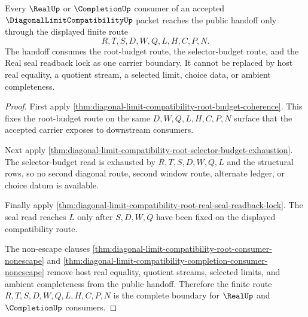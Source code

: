 \begin{theorem}
\label{thm:diagonal-limit-compatibility-finite-window-handoff-boundary}
Every $\RealUp$ or $\CompletionUp$ consumer of an accepted
$\DiagonalLimitCompatibilityUp$ packet reaches the public handoff only through
the displayed finite route
$$
R,T,S,D,W,Q,L,H,C,P,N.
$$
The handoff consumes the root-budget route, the selector-budget route, and the
Real seal readback lock as one carrier boundary. It cannot be replaced by host
real equality, a quotient stream, a selected limit, choice data, or ambient
completeness.
\end{theorem}
\begin{proof}
First apply
\autoref{thm:diagonal-limit-compatibility-root-budget-coherence}. This fixes
the root-budget route on the same $D,W,Q,L,H,C,P,N$ surface that the accepted
carrier exposes to downstream consumers.

Next apply
\autoref{thm:diagonal-limit-compatibility-root-selector-budget-exhaustion}.
The selector-budget read is exhausted by $R,T,S,D,W,Q,L$ and the structural
rows, so no second diagonal route, second window route, alternate ledger, or
choice datum is available.

Finally apply
\autoref{thm:diagonal-limit-compatibility-root-real-seal-readback-lock}. The
seal read reaches $L$ only after $S,D,W,Q$ have been fixed on the displayed
compatibility route.

The non-escape clauses
\autoref{thm:diagonal-limit-compatibility-root-consumer-nonescape} and
\autoref{thm:diagonal-limit-compatibility-completion-consumer-nonescape}
remove host real equality, quotient streams, selected limits, and ambient
completeness from the public handoff. Therefore the finite route
$R,T,S,D,W,Q,L,H,C,P,N$ is the complete boundary for $\RealUp$ and
$\CompletionUp$ consumers.
\end{proof}


